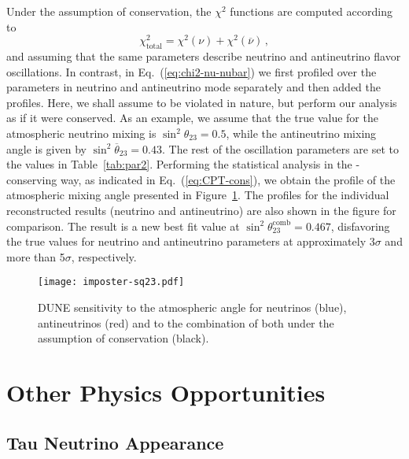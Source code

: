 Under the assumption of  conservation, the $\chi^2$ functions are computed according to
%
\begin{equation}
 \chi^2_{\text{total}}=\chi^2(\nu)+\chi^2(\overline{\nu})\, ,
 \label{eq:CPT-cons}
\end{equation}
%
and assuming that the same parameters describe neutrino and antineutrino flavor oscillations. In contrast, in Eq.~(\ref{eq:chi2-nu-nubar}) we first profiled over the parameters in neutrino and antineutrino mode separately and then added the profiles. Here, we shall assume  to be violated in nature, but perform our analysis as if it were conserved. As an example, we assume that the true value for the atmospheric neutrino mixing is $\sin^2\theta_{23}=0.5$, while the antineutrino mixing angle is given by $\sin^2\overline{\theta}_{23}=0.43$. The rest of the oscillation parameters are set to the values in Table~\ref{tab:par2}. Performing the statistical analysis in the -conserving way, as indicated in Eq.~(\ref{eq:CPT-cons}), we obtain the profile of the atmospheric mixing angle presented in Figure~\ref{fig:imposter-sq23}. The profiles for the individual reconstructed results (neutrino and antineutrino) are also shown in the figure for comparison.
The result is a new best fit value at $\sin^2\theta^\text{comb}_{23}=0.467$, disfavoring the true values for neutrino and antineutrino parameters at approximately 3$\sigma$ and more than 5$\sigma$, respectively. 

\begin{figure}[!htb]
 \centering
        \texttt{[image: imposter-sq23.pdf]}
        \caption[Sensitivity to atmospheric angle for neutrinos, antineutrinos, and combination under  conservation]{DUNE sensitivity to the atmospheric angle for neutrinos (blue), antineutrinos (red) and to the combination of both under the assumption of  conservation (black).
         }
	\label{fig:imposter-sq23}
\end{figure}


\section{Other  Physics Opportunities}

\subsection{Tau Neutrino Appearance} 


